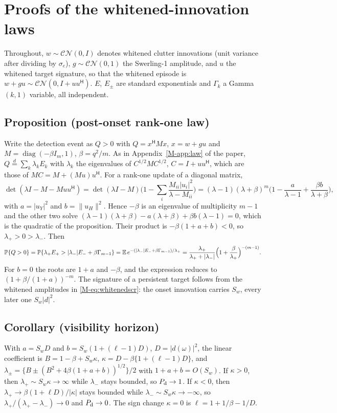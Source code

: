 \section{Proofs of the whitened-innovation laws}\label{sup:r12proofs}
Throughout, $w\sim\mathcal{CN}(0,I)$ denotes whitened clutter innovations (unit variance after dividing by $\sigma_e$), $g\sim\mathcal{CN}(0,1)$ the Swerling-1 amplitude, and $u$ the whitened target signature, so that the whitened episode is $w+gu\sim\mathcal{CN}(0,I+uu^{\mathsf H})$. $E$, $E_\pm$ are standard exponentials and $\Gamma_k$ a Gamma$(k,1)$ variable, all independent.

\subsection{Proposition (post-onset rank-one law)}
Write the detection event as $Q>0$ with $Q=x^{\mathsf H}Mx$, $x=w+gu$ and $M=\operatorname{diag}(-\beta I_m,1)$, $\beta=q^2/m$. As in Appendix~\ref{M-app:law} of the paper, $Q\overset{d}{=}\sum_k\lambda_kE_k$ with $\lambda_k$ the eigenvalues of $C^{1/2}MC^{1/2}$, $C=I+uu^{\mathsf H}$, which are those of $MC=M+(Mu)u^{\mathsf H}$. For a rank-one update of a diagonal matrix,
\[
\det(\lambda I-M-Muu^{\mathsf H})=\det(\lambda I-M)\Big(1-\sum_i\frac{M_{ii}|u_i|^2}{\lambda-M_{ii}}\Big)=(\lambda-1)(\lambda+\beta)^m\Big(1-\frac{a}{\lambda-1}+\frac{\beta b}{\lambda+\beta}\Big),
\]
with $a=|u_Y|^2$ and $b=\|u_H\|^2$. Hence $-\beta$ is an eigenvalue of multiplicity $m-1$ and the other two solve $(\lambda-1)(\lambda+\beta)-a(\lambda+\beta)+\beta b(\lambda-1)=0$, which is the quadratic of the proposition. Their product is $-\beta(1+a+b)<0$, so $\lambda_+>0>\lambda_-$. Then
\[
\mathbb{P}\{Q>0\}=\mathbb{P}\{\lambda_+E_+>|\lambda_-|E_-+\beta\Gamma_{m-1}\}=\mathbb E\,e^{-(|\lambda_-|E_-+\beta\Gamma_{m-1})/\lambda_+}=\frac{\lambda_+}{\lambda_++|\lambda_-|}\Big(1+\frac{\beta}{\lambda_+}\Big)^{-(m-1)}.
\]
For $b=0$ the roots are $1+a$ and $-\beta$, and the expression reduces to $(1+\beta/(1+a))^{-m}$. The signature of a persistent target follows from the whitened amplitudes in \eqref{M-eq:whitenedscr}: the onset innovation carries $S_w$, every later one $S_w|d|^2$.

\subsection{Corollary (visibility horizon)}
With $a=S_wD$ and $b=S_w(1+(\ell-1)D)$, $D=|d(\omega)|^2$, the linear coefficient is $B=1-\beta+S_w\kappa$, $\kappa=D-\beta\{1+(\ell-1)D\}$, and $\lambda_\pm=\{B\pm(B^2+4\beta(1+a+b))^{1/2}\}/2$ with $1+a+b=O(S_w)$. If $\kappa>0$, then $\lambda_+\sim S_w\kappa\to\infty$ while $\lambda_-$ stays bounded, so $P_{\rm d}\to1$. If $\kappa<0$, then $\lambda_+\to\beta(1+\ell D)/|\kappa|$ stays bounded while $\lambda_-\sim S_w\kappa\to-\infty$, so $\lambda_+/(\lambda_+-\lambda_-)\to0$ and $P_{\rm d}\to0$. The sign change $\kappa=0$ is $\ell=1+1/\beta-1/D$.


